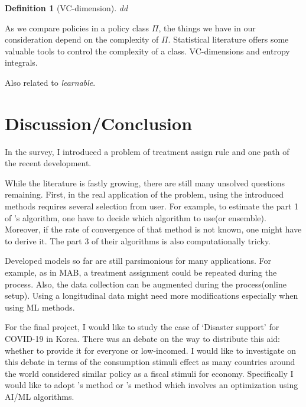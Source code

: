 \documentclass[11pt]{article}
\newtheorem{definition}[theorem]{Definition}
\begin{document}
	\begin{definition}[VC-dimension]
		dd
	\end{definition}
	
As we compare policies in a policy class $\Pi$, the things we have in our consideration depend on the complexity of $\Pi$. Statistical literature offers some valuable tools to control the complexity of a class.
VC-dimensions and entropy integrals.

Also related to \textit{learnable}.

	\section{Discussion/Conclusion}
	In the survey, I introduced a problem of treatment assign rule and one path of the recent development.
	
	While the literature is fastly growing, there are still many unsolved questions remaining. First, in the real application of the problem, using the introduced methods requires several selection from user. For example, to estimate the part 1 of \cite{Athey.2017txo}'s algorithm, one have to decide which algorithm to use(or ensemble). Moreover, if the rate of convergence of that method is not known, one might have to derive it. The part 3 of their algorithms is also computationally tricky.
	
	Developed models so far are still parsimonious for many applications. For example, as in MAB, a treatment assignment could be repeated during the process. Also, the data collection can be augmented during the process(online setup). Using a longitudinal data might need more modifications especially when using ML methods.
	
	For the final project, I would like to study the case of `Disaster support' for COVID-19 in Korea. There was an debate on the way to distribute this aid: whether to provide it for everyone or low-incomed. I would like to investigate on this debate in terms of the consumption stimuli effect as many countries around the world considered similar policy as a fiscal stimuli for economy. Specifically I would like to adopt \cite{Kitagawa.2018}'s method or \cite{Athey.2017txo}'s method which involves an optimization using AI/ML algorithms.
	
	
	
	
	
\end{document}
